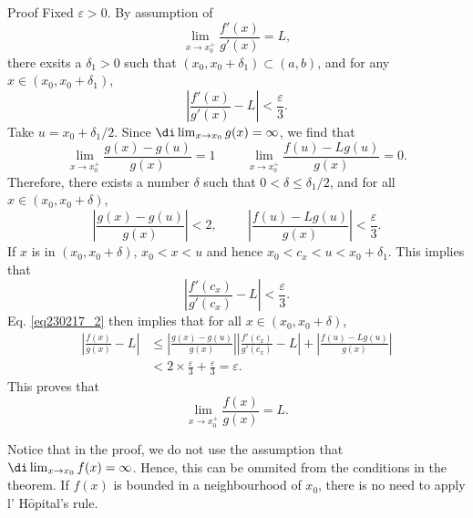 \begin{example}{}
\begin{myproof}{Proof}
Fixed $\varepsilon>0$. By assumption of
\[\lim_{x\rightarrow x_0^+}\frac{f'(x)}{g'(x)}=L,\]
  there exsits a $\delta_1>0$ such that $(x_0, x_0+\delta_1)\subset (a,b)$, and for any $x\in (x_0, x_0+\delta_1)$, 
\[\left|\frac{f'(x)}{g'(x)}-L\right|<\frac{\varepsilon}{3}.\]Take $u=x_0+\delta_1/2$. 
Since $\di \lim_{x\rightarrow x_0}g(x)=\infty$, we find that
\[\lim_{x\to x_0^+}\frac{g(x)-g(u)}{g(x)}=1\hspace{1cm}\lim_{x\to x_0^+}\frac{f(u)-Lg(u)}{g(x)}=0.\]
Therefore, there exists a number $\delta$ such that $0<\delta\leq\delta_1/2$, and for all $x\in (x_0, x_0+\delta)$,
\[\left|\frac{g(x)-g(u)}{g(x)}\right|<2,\hspace{1cm}\left|\frac{f(u)-Lg(u)}{g(x)}\right|<\frac{\varepsilon}{3}.\]
If $x$ is in $(x_0, x_0+\delta)$, $x_0<x<u$ and hence $x_0<c_x<u<x_0+\delta_1$. This implies that
\[\left|\frac{f'(c_x)}{g'(c_x)}-L\right|<\frac{\varepsilon}{3}.\] 
Eq. \eqref{eq230217_2} then implies that for all $x\in (x_0, x_0+\delta)$,
\begin{align*}
\left|\frac{f(x)}{g(x)}-L\right|&\leq \left|\frac{g(x)-g(u)}{g(x)}\right|\left| \frac{f'(c_x)}{g'(c_x)}-L\right|+\left|\frac{f(u)-Lg(u)}{g(x)}\right|\\
&<2\times\frac{\varepsilon}{3}+\frac{\varepsilon}{3}=\varepsilon.
\end{align*}\bp
This proves that 
\[ \lim_{x\rightarrow x_0^+}\frac{f(x)}{g(x)}=L.\]

 
\end{myproof} Notice that in the proof, we do not use the assumption that $\di\lim_{x\to x_0}f(x)=\infty$. Hence, this can be ommited from the conditions in the theorem. If $f(x)$ is bounded in a neighbourhood of $x_0$, there is no need to apply l' H$\hat{\text{o}}$pital's rule.


\end{example}
